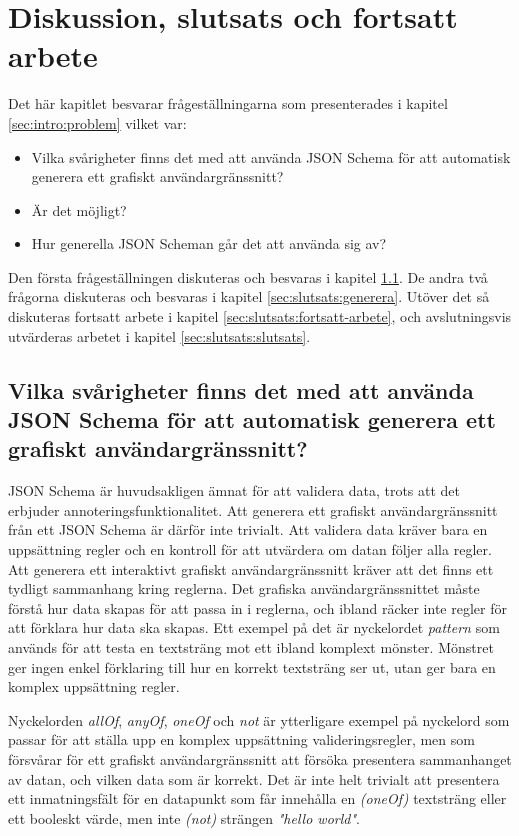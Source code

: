 \chapter{Diskussion, slutsats och fortsatt arbete}
\label{sec:slutsats}

Det här kapitlet besvarar frågeställningarna som presenterades i kapitel \ref{sec:intro:problem} vilket var:

\begin{itemize}
	\item Vilka svårigheter finns det med att använda JSON Schema för att automatisk generera ett grafiskt
	användargränssnitt?
	\item Är det möjligt?
	\item Hur generella JSON Scheman går det att använda sig av?
\end{itemize}

Den första frågeställningen diskuteras och besvaras i kapitel \ref{sec:slutsats:json-schema}. De andra två frågorna diskuteras och besvaras i kapitel \ref{sec:slutsats:generera}. Utöver det så diskuteras fortsatt arbete i kapitel \ref{sec:slutsats:fortsatt-arbete}, och avslutningsvis utvärderas arbetet i kapitel \ref{sec:slutsats:slutsats}.

\newpage

\section{Vilka svårigheter finns det med att använda JSON Schema för att automatisk generera ett grafiskt användargränssnitt?}
\label{sec:slutsats:json-schema}
JSON Schema är huvudsakligen ämnat för att validera data, trots att det erbjuder annoteringsfunktionalitet. Att generera ett grafiskt användargränssnitt från ett JSON Schema är därför inte trivialt. Att validera data kräver bara en uppsättning regler och en kontroll för att utvärdera om datan följer alla regler. Att generera ett interaktivt grafiskt användargränssnitt kräver att det finns ett tydligt sammanhang kring reglerna. Det grafiska användargränssnittet måste förstå hur data skapas för att passa in i reglerna, och ibland räcker inte regler för att förklara hur data ska skapas. Ett exempel på det är nyckelordet \textit{pattern} som används för att testa en textsträng mot ett ibland komplext mönster. Mönstret ger ingen enkel förklaring till hur en korrekt textsträng ser ut, utan ger bara en komplex uppsättning regler.

Nyckelorden \textit{allOf}, \textit{anyOf}, \textit{oneOf} och \textit{not} är ytterligare exempel på nyckelord som passar för att ställa upp en komplex uppsättning valideringsregler, men som försvårar för ett grafiskt användargränssnitt att försöka presentera sammanhanget av datan, och vilken data som är korrekt. Det är inte helt trivialt att presentera ett inmatningsfält för en datapunkt som får innehålla en \textit{(oneOf)} textsträng eller ett booleskt värde, men inte \textit{(not)} strängen \textit{"hello world"}.

